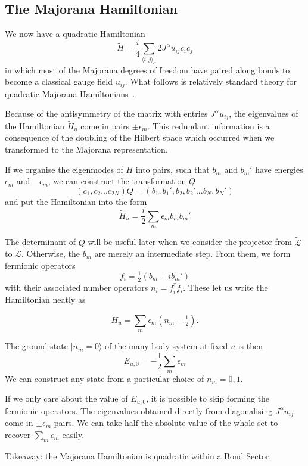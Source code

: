 \hypertarget{the-majorana-hamiltonian}{%
\subsection{The Majorana Hamiltonian}\label{the-majorana-hamiltonian}}

We now have a quadratic Hamiltonian \[ \tilde{H} =  \frac{i}{4} \sum_{\langle i,j\rangle_\alpha} 2J^{\alpha} u_{ij} c_i c_j\] in which most of the Majorana degrees of freedom have paired along bonds to become a classical gauge field \(u_{ij}\). What follows is relatively standard theory for quadratic Majorana Hamiltonians~\autocite{BlaizotRipka1986}.

Because of the antisymmetry of the matrix with entries \(J^{\alpha} u_{ij}\), the eigenvalues of the Hamiltonian \(\tilde{H}_u\) come in pairs \(\pm \epsilon_m\). This redundant information is a consequence of the doubling of the Hilbert space which occurred when we transformed to the Majorana representation.

If we organise the eigenmodes of \(H\) into pairs, such that \(b_m\) and \(b_m'\) have energies \(\epsilon_m\) and \(-\epsilon_m\), we can construct the transformation \(Q\) \[(c_1, c_2... c_{2N}) Q = (b_1, b_1', b_2, b_2' ... b_{N}, b_{N}')\] and put the Hamiltonian into the form \[\tilde{H}_u = \frac{i}{2} \sum_m \epsilon_m b_m b_m'\]

The determinant of \(Q\) will be useful later when we consider the projector from \(\mathcal{\tilde{L}}\) to \(\mathcal{L}\). Otherwise, the \(b_m\) are merely an intermediate step. From them, we form fermionic operators \[ f_i = \tfrac{1}{2} (b_m + ib_m')\] with their associated number operators \(n_i = f^\dagger_i f_i\). These let us write the Hamiltonian neatly as

\[ \tilde{H}_u = \sum_m \epsilon_m (n_m - \tfrac{1}{2}).\]

The ground state \(|n_m = 0\rangle\) of the many body system at fixed \(u\) is then \[E_{u,0} = -\frac{1}{2}\sum_m \epsilon_m \] We can construct any state from a particular choice of \(n_m = 0,1\).

If we only care about the value of \(E_{u,0}\), it is possible to skip forming the fermionic operators. The eigenvalues obtained directly from diagonalising \(J^{\alpha} u_{ij}\) come in \(\pm \epsilon_m\) pairs. We can take half the absolute value of the whole set to recover \(\sum_m \epsilon_m\) easily.

Takeaway: the Majorana Hamiltonian is quadratic within a Bond Sector.

